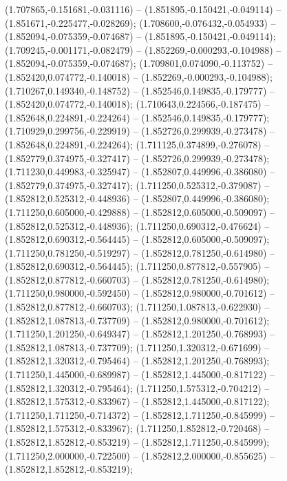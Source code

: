  (1.707865,-0.151681,-0.031116) -- (1.851895,-0.150421,-0.049114) -- (1.851671,-0.225477,-0.028269);
 (1.708600,-0.076432,-0.054933) -- (1.852094,-0.075359,-0.074687) -- (1.851895,-0.150421,-0.049114);
 (1.709245,-0.001171,-0.082479) -- (1.852269,-0.000293,-0.104988) -- (1.852094,-0.075359,-0.074687);
 (1.709801,0.074090,-0.113752) -- (1.852420,0.074772,-0.140018) -- (1.852269,-0.000293,-0.104988);
 (1.710267,0.149340,-0.148752) -- (1.852546,0.149835,-0.179777) -- (1.852420,0.074772,-0.140018);
 (1.710643,0.224566,-0.187475) -- (1.852648,0.224891,-0.224264) -- (1.852546,0.149835,-0.179777);
 (1.710929,0.299756,-0.229919) -- (1.852726,0.299939,-0.273478) -- (1.852648,0.224891,-0.224264);
 (1.711125,0.374899,-0.276078) -- (1.852779,0.374975,-0.327417) -- (1.852726,0.299939,-0.273478);
 (1.711230,0.449983,-0.325947) -- (1.852807,0.449996,-0.386080) -- (1.852779,0.374975,-0.327417);
 (1.711250,0.525312,-0.379087) -- (1.852812,0.525312,-0.448936) -- (1.852807,0.449996,-0.386080);
 (1.711250,0.605000,-0.429888) -- (1.852812,0.605000,-0.509097) -- (1.852812,0.525312,-0.448936);
 (1.711250,0.690312,-0.476624) -- (1.852812,0.690312,-0.564445) -- (1.852812,0.605000,-0.509097);
 (1.711250,0.781250,-0.519297) -- (1.852812,0.781250,-0.614980) -- (1.852812,0.690312,-0.564445);
 (1.711250,0.877812,-0.557905) -- (1.852812,0.877812,-0.660703) -- (1.852812,0.781250,-0.614980);
 (1.711250,0.980000,-0.592450) -- (1.852812,0.980000,-0.701612) -- (1.852812,0.877812,-0.660703);
 (1.711250,1.087813,-0.622930) -- (1.852812,1.087813,-0.737709) -- (1.852812,0.980000,-0.701612);
 (1.711250,1.201250,-0.649347) -- (1.852812,1.201250,-0.768993) -- (1.852812,1.087813,-0.737709);
 (1.711250,1.320312,-0.671699) -- (1.852812,1.320312,-0.795464) -- (1.852812,1.201250,-0.768993);
 (1.711250,1.445000,-0.689987) -- (1.852812,1.445000,-0.817122) -- (1.852812,1.320312,-0.795464);
 (1.711250,1.575312,-0.704212) -- (1.852812,1.575312,-0.833967) -- (1.852812,1.445000,-0.817122);
 (1.711250,1.711250,-0.714372) -- (1.852812,1.711250,-0.845999) -- (1.852812,1.575312,-0.833967);
 (1.711250,1.852812,-0.720468) -- (1.852812,1.852812,-0.853219) -- (1.852812,1.711250,-0.845999);
 (1.711250,2.000000,-0.722500) -- (1.852812,2.000000,-0.855625) -- (1.852812,1.852812,-0.853219);
